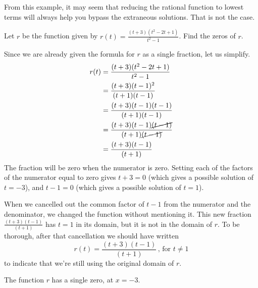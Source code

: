\documentclass[nooutcomes]{ximera}
\begin{document}
	From this example, it may seem that reducing the rational function to lowest terms will always help you bypass the extraneous solutions. 
	That is not the case.
	
	\begin{example}

		Let $r$ be the function given by $r(t) = \frac{(t+3)(t^2-2t+1)}{t^2-1}$. Find the zeros of $r$.
	
		\begin{explanation}

			Since we are already given the formula for $r$ as a single fraction, let us simplify.
			\begin{align*}
				r(t) &= \frac{(t+3)(t^2-2t+1)}{t^2-1}\\
					&= \frac{(t+3)(t-1)^2}{(t+1)(t-1)}\\
					&= \frac{(t+3)(t-1)(t-1)}{(t+1)(t-1)}\\
					&= \frac{(t+3)(t-1)\cancel{(t-1)}}{(t+1)\cancel{(t-1)}}\\
					&= \frac{(t+3)(t-1)}{(t+1)}
			\end{align*}
			The fraction will be zero when the numerator is zero. Setting each of the factors of the numerator equal to zero gives
			$t+3=0$ (which gives a possible solution of $t=-3$), and $t-1=0$ (which gives a possible solution of $t=1$).
			
			When we cancelled out the common factor of $t-1$ from the numerator and the denominator, we changed the function without 
			mentioning it. This new fraction $\frac{(t+3)(t-1)}{(t+1)}$ has $t=1$ in its domain, but it is not in the domain of $r$. 
			To be thorough, after that cancellation we should have written
			\[ r(t) = \frac{(t+3)(t-1)}{(t+1)}  \, \text{, for } t \neq 1 \]
			to indicate that we're still using the original domain of $r$.
			
			The function $r$ has a single zero, at $x=-3$.
			
		\end{explanation}
	\end{example}
	
	
\end{document}
